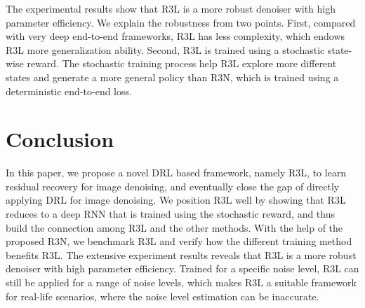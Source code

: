\documentclass{article}
\begin{document}
The experimental results show that R3L is a more robust denoiser with high parameter efficiency. We explain the robustness from two points. First, compared with very deep end-to-end frameworks, R3L has less complexity, which endows R3L more generalization ability. Second, R3L is trained using a stochastic state-wise reward. The stochastic training process help R3L explore more different states and generate a more general policy than R3N, which is trained using a deterministic end-to-end loss. 

\begin{table}[htbp]
\caption{The average PSNR (dB) results of different methods.All the methods are set/trained with $\sigma=35$. The best and the second best results are highlighted in \textcolor{red}{red} and \textcolor{blue}{blue} respectively.} \label{tab:35}
\centering
{}
\end{table}
\section{Conclusion}
In this paper, we propose a novel DRL based framework, namely R3L, to learn residual recovery for image denoising, and eventually close the gap of directly applying DRL for image denoising. We position R3L well by showing that R3L reduces to a deep RNN that is trained using the stochastic reward, and thus build the connection among R3L and the other methods. With the help of the proposed R3N, we benchmark R3L and verify how the different training method benefits R3L. The extensive experiment  results  reveals  that  R3L  is  a more  robust  denoiser  with  high parameter efficiency. Trained for a specific noise level, R3L can still be applied for a range of noise levels, which makes R3L a suitable framework for real-life scenarios, where the noise level estimation can be inaccurate.








\end{document}
